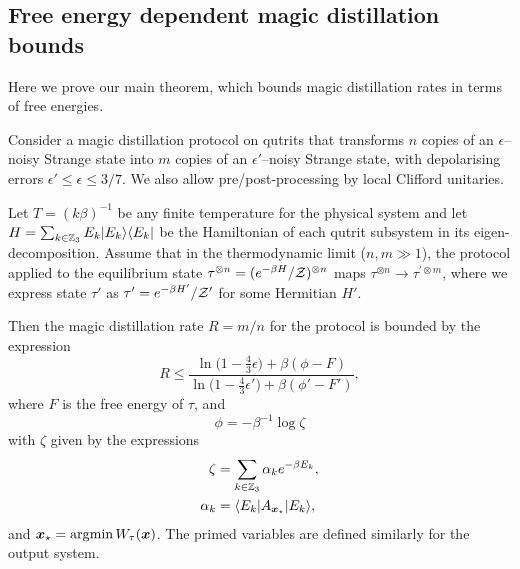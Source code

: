 \documentclass[pra,
aps,
twocolumn,
superscriptaddress,
groupedaddress,
nofootinbib,
reprint
]{revtex4-1}
\begin{document}
\subsection{Free energy dependent magic distillation bounds}\label{free-energy-bound-proof}
\label{app:main_proof}
Here we prove our main theorem, which bounds magic distillation rates in terms of free energies.

\begingroup
\def\thetheorem{\ref{thm:free-energy}}
\begin{theorem}
	Consider a magic distillation protocol on qutrits that transforms $n$ copies of an $\epsilon$--noisy Strange state into $m$ copies of an $\epsilon'$--noisy Strange state, with depolarising errors $\epsilon' \leq \epsilon \leq 3/7$. We also allow pre/post-processing by local Clifford unitaries.
	
	Let $T =(k\beta)^{-1}$ be any finite temperature for the physical system and let $H= \sum_{k \in \mathbb{Z}_3} E_k |E_k\rangle\langle E_k|$ be the Hamiltonian of each qutrit subsystem in its eigen-decomposition.
Assume that in the thermodynamic limit ($n,m \gg 1$), the protocol applied to the equilibrium state $\tau^{\otimes n} = (e^{-\beta H}/\mathcal{Z})^{\otimes n}$ maps $\tau^{\otimes n} \longrightarrow \tau^{\prime \otimes m}$, where we express state $\tau'$ as $\tau' = e^{-\beta H'}/\mathcal{Z}'$ for some Hermitian $H'$.

Then the magic distillation rate $R = m/n$ for the protocol is bounded by the expression
\begin{equation}\label{eq:rate_bounds_proof}
	R \leq \dfrac{\ln{\big( 1-\frac{4}{3}\epsilon \big)} + \beta (\phi - F)}{\ln{\big( 1-\frac{4}{3}\epsilon' \big)} + \beta (\phi' - F')},
\end{equation}
where $F$ is the free energy of $\tau$,  and 
\begin{equation}
	\phi = -\beta^{-1} \log \zeta
\end{equation}
with $\zeta$ given by the expressions
\begin{align}
	\zeta &= \sum_{k\in \mathbb{Z}_3} \alpha_k e^{-\beta E_k}, \nonumber\\
	\alpha_k &= \langle E_k| A_{\boldsymbol{x}_\star} |E_k\rangle,
\end{align}
and $\boldsymbol{x}_\star = \arg\!\min W_\tau(\boldsymbol{x})$. The primed variables are defined similarly for the output system.
\end{theorem}
\addtocounter{theorem}{-1}
\endgroup
\end{document}
